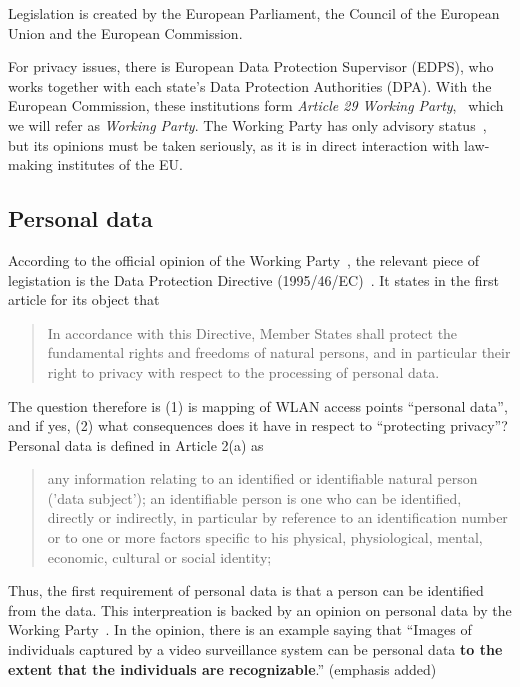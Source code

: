 \documentclass[12pt,a4paper,oneside,pdftex]{report}
\begin{document}
Legislation is created by the European Parliament, the Council of the European Union and the European Commission.~\cite{eu_institutions}

For privacy issues, there is European Data Protection Supervisor (EDPS), who works together with each state's Data Protection Authorities (DPA). With the European Commission, these institutions form \emph{Article 29 Working Party},~\cite{wp29_rules} which we will refer as \emph{Working Party}. The Working Party has only advisory status~\cite{wp29_rules}, but its opinions must be taken seriously, as it is in direct interaction with law-making institutes of the EU.

\subsection{Personal data}
\label{subsec:eu:personal_data}

According to the official opinion of the Working Party~\cite{wp29_185}, the relevant piece of legistation is the Data Protection Directive (1995/46/EC)~\cite{data_protection}. It states in the first article for its object that

\begin{quote}
    In accordance with this Directive, Member States shall protect the fundamental rights and freedoms of natural persons, and in particular their right to privacy with respect to the processing of personal data.
\end{quote}

The question therefore is (1) is mapping of WLAN access points ``personal data'', and if yes, (2) what consequences does it have in respect to ``protecting privacy''? Personal data is defined in Article 2(a) as

\begin{quote}
    any information relating to an identified or identifiable natural person ('data subject'); an identifiable person is one who can be identified, directly or indirectly, in particular by reference to an identification number or to one or more factors specific to his physical, physiological, mental, economic, cultural or social identity;
\end{quote}

Thus, the first requirement of personal data is that a person can be identified from the data. This interpreation is backed by an opinion on personal data by the Working Party~\cite{wp29_136}. In the opinion, there is an example saying that ``Images of individuals captured by a video surveillance system can be personal data \textbf{to the extent that the individuals are recognizable}.'' (emphasis added)
\end{document}
